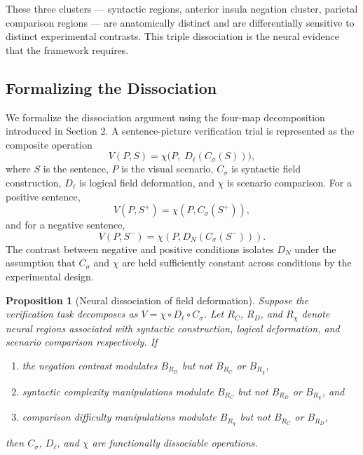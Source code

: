 \documentclass[12pt]{article}
\newtheorem{proposition}[theorem]{Proposition}
\theoremstyle{remark}
\begin{document}
These three clusters --- syntactic regions, anterior insula negation
cluster, parietal comparison regions --- are anatomically distinct and
are differentially sensitive to distinct experimental contrasts. This
triple dissociation is the neural evidence that the framework requires.

\subsection{Formalizing the Dissociation}

We formalize the dissociation argument using the four-map decomposition
introduced in Section 2. A sentence-picture verification trial is
represented as the composite operation
\[
V(P, S) = \chi\bigl(P,\; D_\ell(C_{\sigma}(S))\bigr),
\]
where $S$ is the sentence, $P$ is the visual scenario, $C_{\sigma}$ is
syntactic field construction, $D_\ell$ is logical field deformation, and
$\chi$ is scenario comparison. For a positive sentence,
\[
V(P, S^+) = \chi(P, C_{\sigma}(S^+)),
\]
and for a negative sentence,
\[
V(P, S^-) = \chi(P, D_N(C_{\sigma}(S^-))).
\]
The contrast between negative and positive conditions isolates $D_N$
under the assumption that $C_{\sigma}$ and $\chi$ are held sufficiently
constant across conditions by the experimental design.
\begin{proposition}[Neural dissociation of field deformation]
\label{prop:dissociation}
Suppose the verification task decomposes as $V = \chi \circ D_\ell \circ
C_{\sigma}$. Let $R_C$, $R_D$, and $R_\chi$ denote neural regions
associated with syntactic construction, logical deformation, and scenario
comparison respectively. If
\begin{enumerate}
\item[(i)] the negation contrast modulates $B_{R_D}$ but not $B_{R_C}$
or $B_{R_\chi}$,
\item[(ii)] syntactic complexity manipulations modulate $B_{R_C}$ but
not $B_{R_D}$ or $B_{R_\chi}$, and
\item[(iii)] comparison difficulty manipulations modulate $B_{R_\chi}$
but not $B_{R_C}$ or $B_{R_D}$,
\end{enumerate}
then $C_{\sigma}$, $D_\ell$, and $\chi$ are functionally dissociable
operations.
\end{proposition}
\end{document}
